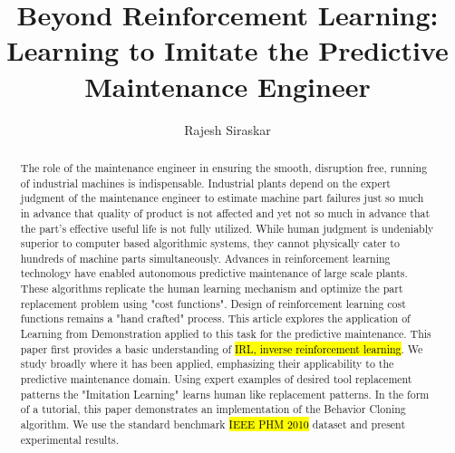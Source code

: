 \documentclass{article}
\title{Beyond Reinforcement Learning: Learning to Imitate the Predictive Maintenance Engineer}
\author{Rajesh Siraskar}
\newcommand{\hlc}[2][blue!10]{{\colorlet{foo}{#1} \sethlcolor{foo}\hl{#2}}}
\begin{document}
\maketitle
\begin{abstract}
	The role of the maintenance engineer in ensuring the smooth, disruption free, running of industrial machines is indispensable. Industrial plants depend on the expert judgment of the maintenance engineer to estimate machine part failures just so much in advance that quality of product is not affected and yet not so much in advance that the part's effective useful life is not fully utilized. While human judgment is undeniably superior to computer based algorithmic systems, they cannot physically cater to hundreds of machine parts simultaneously. Advances in reinforcement learning technology have enabled autonomous predictive maintenance of large scale plants. These algorithms replicate the human learning mechanism and optimize the part replacement problem using "cost functions". Design of reinforcement learning cost functions remains a "hand crafted" process. This article explores the application of Learning from Demonstration applied to this task for the predictive maintenance. This paper first provides a basic understanding of \hlc{IRL, inverse reinforcement learning}. We study broadly where it has been applied, emphasizing their applicability to the predictive maintenance domain. Using expert examples of desired tool replacement patterns the "Imitation Learning" learns human like replacement patterns. In the form of a tutorial, this paper demonstrates an implementation of the Behavior Cloning algorithm. We use the standard benchmark \hlc{IEEE PHM 2010} dataset and present experimental results.
\end{abstract}

\clearpage
\end{document}
